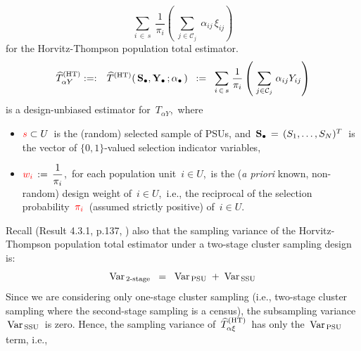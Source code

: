 \begin{itemize}
{{\begin{equation*}
            \underset{i\,\in\,s}{\sum}\;
                \dfrac{1}{\pi_{i}}\!
                \left(\;
                    \underset{j \in \mathcal{C}_{j}}{\sum}\;\alpha_{ij}\,\xi_{ij}
                    \right)
        \end{equation*}
        for the Horvitz-Thompson population total estimator.
        }
    }
    \begin{eqnarray*}
    \widehat{T}^{\textnormal{(HT)}}_{\alpha Y}
    & :=: &
        \widehat{T}^{\textnormal{(HT)}}(\,\mathbf{S}_{\bullet},\mathbf{Y}_{\bullet}\,;\alpha_{\bullet}\,)
    \;\; := \;\;
        \underset{i\,\in\,s}{\sum}\;
            \dfrac{1}{\pi_{i}}
            \left(\;
                \underset{j \in \mathcal{C}_{j}}{\sum}\;
                \alpha_{ij}Y_{ij}
                \right)
    \end{eqnarray*}
    is a design-unbiased estimator for
    \,$T_{\alpha Y}$,\,
    where
    \begin{itemize}
    \item
        ${\color{red}s} \subset U$\, is the (random) selected sample of PSUs, and
        \,$\mathbf{S}_{\bullet} \,=\, (S_{1},\ldots,S_{N})^{T}$\,
        is the vector of $\{0,1\}$-valued selection indicator variables,
    \item
        ${\color{red}w_{i}} \,:=\, \dfrac{1}{\pi_{i}}$,\, for each population unit \,$i \in U$,\,
        is the (\textit{a priori} known, non-random) design weight of \,$i \in U$,\,
        i.e., the reciprocal of the selection probability \,${\color{red}\pi_{i}}$\,
        (assumed strictly positive) of \,$i \in U$.\,
    \end{itemize}
    Recall (Result 4.3.1, p.137, \cite{Sarndal1992}) also that
    the sampling variance of the Horvitz-Thompson population total estimator
    under a two-stage cluster sampling design is:
    \begin{equation*}
    \textnormal{Var}_{\,\textnormal{2-stage}}
    \;\; = \;\;
        \textnormal{Var}_{\,\textnormal{PSU}}
        \; + \;
        \textnormal{Var}_{\,\textnormal{SSU}}
    \end{equation*}
    Since we are considering only one-stage cluster sampling
    (i.e., two-stage cluster sampling where the second-stage sampling is a census),
    the subsampling variance \,$\textnormal{Var}_{\,\textnormal{SSU}}$\, is zero.
    Hence, the sampling variance of
    \,$
    \widehat{T}^{\textnormal{(HT)}}_{\alpha\xi}
    $\,
    has only the \,$\textnormal{Var}_{\,\textnormal{PSU}}$\, term, i.e.,

\end{itemize}
